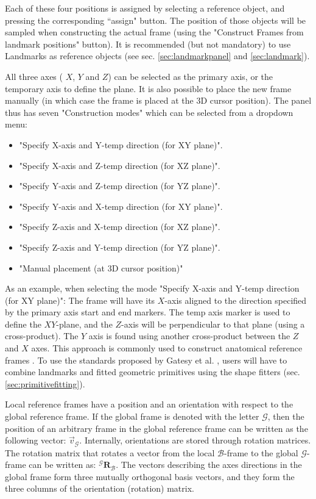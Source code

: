 \documentclass{article}
\begin{document}
Each of these four positions is assigned by selecting a reference object, and pressing the corresponding ``assign" button. The position of those objects will be sampled when constructing the actual frame (using the "Construct Frames from landmark positions" button). It is recommended (but not mandatory) to use Landmarks as reference objects (see sec. \ref{sec:landmarkpanel} and \ref{sec:landmark}).

All three axes ( \(X\), \(Y\) and \(Z\)) can be selected as the primary axis, or the temporary axis to define the plane. It is also possible to place the new frame manually (in which case the frame is placed at the 3D cursor position). The panel thus has seven "Construction modes" which can be selected from a dropdown menu:

\begin{itemize}
    \item "Specify X-axis and Y-temp direction (for XY plane)".  
    \item "Specify X-axis and Z-temp direction (for XZ plane)".
    \item "Specify Y-axis and Z-temp direction (for YZ plane)".
    \item "Specify Y-axis and X-temp direction (for XY plane)".
    \item "Specify Z-axis and X-temp direction (for XZ plane)".
    \item "Specify Z-axis and Y-temp direction (for YZ plane)".
    \item "Manual placement (at 3D cursor position)"
\end{itemize}


As an example, when selecting the mode "Specify X-axis and Y-temp direction (for XY plane)": The frame will have its \(X\)-axis aligned to the direction specified by the primary axis start and end markers. The temp axis marker is used to define the \(XY\)-plane, and the \(Z\)-axis will be perpendicular to that plane (using a cross-product). The \(Y\) axis is found using another cross-product between the \(Z\) and \(X\) axes. This approach is commonly used to construct anatomical reference frames \cite{wuISBRecommendationsStandardization1995,wuISBRecommendationDefinitions2002,wuISBRecommendationDefinitions2005}. To use the standards proposed by Gatesy et al. \cite{gatesyProposedStandardQuantifying2022}, users will have to combine landmarks and fitted geometric primitives using the shape fitters  (sec. \ref{sec:primitivefitting}).

Local reference frames have a position and an orientation with respect to the global reference frame. If the global frame is denoted with the letter \(\mathcal{G}\), then the position of an arbitrary frame in the global reference frame can be written as the following vector: \(\vec{v}_{\mathcal{G}}\). Internally, orientations are stored through rotation matrices. The rotation matrix that rotates a vector from the local \(\mathcal{B}\)-frame to the global \(\mathcal{G}\)-frame can be written as: \({}^{\mathcal{G}} \mathbf{R}_{\mathcal{B}}\). The vectors describing the axes directions in the global frame form three mutually orthogonal basis vectors, and they form the three columns of the orientation (rotation) matrix.
\end{document}
